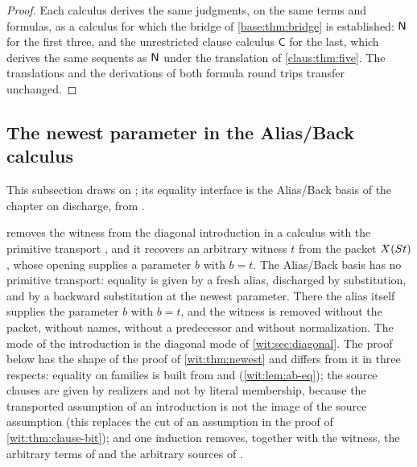 \begin{proof}
Each calculus derives the same judgments, on the same terms and formulas, as
a calculus for which the bridge of \cref{base:thm:bridge} is established:
$\mathsf{N}$ for the first three, and the unrestricted clause calculus
$\mathsf{C}$ for the last, which derives the same sequents as $\mathsf{N}$ under
the translation of \cref{claus:thm:five}.  The translations and the
derivations of both formula round trips transfer unchanged.
\end{proof}

\subsection{The newest parameter in the Alias/Back calculus}
\label{wit:sec:aliasback}

This subsection draws on ; its equality interface
is the Alias/Back basis of the chapter on discharge, from
.

 removes the witness from the diagonal introduction
in a calculus with the primitive transport , and it recovers
an arbitrary witness $t$ from the packet $X(S t)$, whose opening supplies
a parameter $b$ with $b=t$.  The Alias/Back basis has no primitive
transport: equality is given by a fresh alias, discharged by substitution,
and by a backward substitution at the newest parameter.  There the alias
itself supplies the parameter $b$ with $b=t$, and the witness is removed
without the packet, without names, without a predecessor and without
normalization.  The mode of the introduction is the diagonal mode of
\cref{wit:sec:diagonal}.  The proof below has the shape of the proof of
\cref{wit:thm:newest} and differs from it in three respects: equality on
families is built from  and 
(\cref{wit:lem:ab-eq}); the source clauses are given by realizers and not by
literal membership, because the transported assumption of an introduction
is not the image of the source assumption (this replaces the cut of an
assumption in the proof of \cref{wit:thm:clause-bit}); and one induction
removes, together with the witness, the arbitrary terms of 
and the arbitrary sources of .

